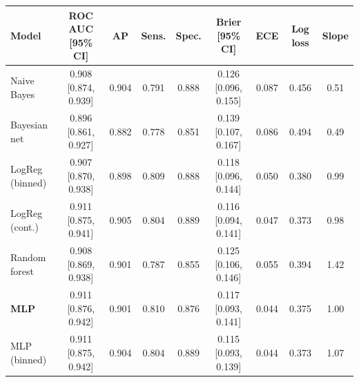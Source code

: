 \begin{tabular}{lcccccccc}
\toprule
Model & ROC AUC [95\% CI] & AP & Sens. & Spec. & Brier [95\% CI] & ECE & Log loss & Slope \\
\midrule
Naive Bayes & 0.908 [0.874, 0.939] & 0.904 & 0.791 & 0.888 & 0.126 [0.096, 0.155] & 0.087 & 0.456 & 0.51 \\
Bayesian net & 0.896 [0.861, 0.927] & 0.882 & 0.778 & 0.851 & 0.139 [0.107, 0.167] & 0.086 & 0.494 & 0.49 \\
LogReg (binned) & 0.907 [0.870, 0.938] & 0.898 & 0.809 & 0.888 & 0.118 [0.096, 0.144] & 0.050 & 0.380 & 0.99 \\
LogReg (cont.) & 0.911 [0.875, 0.941] & 0.905 & 0.804 & 0.889 & 0.116 [0.094, 0.141] & 0.047 & 0.373 & 0.98 \\
Random forest & 0.908 [0.869, 0.938] & 0.901 & 0.787 & 0.855 & 0.125 [0.106, 0.146] & 0.055 & 0.394 & 1.42 \\
\textbf{MLP} & 0.911 [0.876, 0.942] & 0.901 & 0.810 & 0.876 & 0.117 [0.093, 0.141] & 0.044 & 0.375 & 1.00 \\
MLP (binned) & 0.911 [0.875, 0.942] & 0.904 & 0.804 & 0.889 & 0.115 [0.093, 0.139] & 0.044 & 0.373 & 1.07 \\
\bottomrule
\end{tabular}
